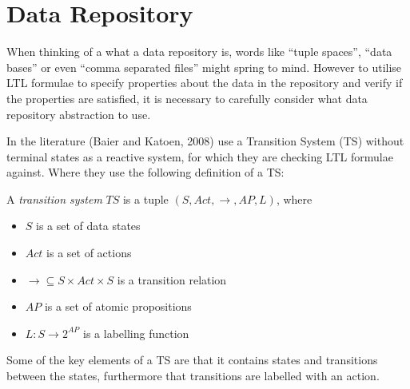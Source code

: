 \section{Data Repository}
When thinking of a what a data repository is, words like ``tuple spaces'', ``data bases'' or even ``comma separated files'' might spring to mind. However to utilise LTL formulae to specify properties about the data in the repository and verify if the properties are satisfied, it is necessary to carefully consider what data repository abstraction to use. 

In the literature (Baier and Katoen, 2008)\cite{baier2008principles} use a Transition System (TS) without terminal states as a reactive system, for which they are checking LTL formulae against. Where they use the following definition of a TS:
\begin{definition}\label{def:ts}
A \emph{transition system} $TS$ is a tuple $\left(S, Act, \longrightarrow, AP, L \right)$, where
\begin{itemize}
  \item $S$ is a set of data states
  \item $Act$ is a set of actions
  \item $\longrightarrow \subseteq S \times Act \times S$ is a transition relation
  \item $AP$ is a set of atomic propositions
  \item $L : S \rightarrow 2^{AP}$ is a labelling function
\end{itemize}
\end{definition}
Some of the key elements of a TS are that it contains states and transitions between the states, furthermore that transitions are labelled with an action. 

